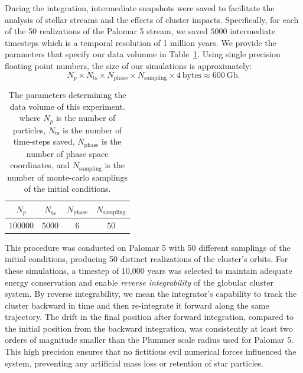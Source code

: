 \documentclass{aa}
\begin{document}
    During the integration, intermediate snapshots were saved to facilitate the analysis of stellar streams and the effects of cluster impacts. Specifically, for each of the 50 realizations of the Palomar 5 stream, we saved $5000$ intermediate timesteps which is a temporal resolution of 1 million years. We provide the parameters that specify our data volumne in Table~\ref{tab:data_volume}. Using single precision floating point numbers, the size of our simulations is approximately:
    \begin{equation} \label{eq:data_volume_estimate}
      N_p \times N_{\textrm{ts}}\times N_{\textrm{phase}}\times N_{\textrm{sampling}} \times 4~\textrm{bytes}\approx 600~\textrm{Gb}.
    \end{equation}

    \begin{table}[h]
      \centering
      \begin{tabular}{|c|c|c|c|}
          \hline
          $N_p$ & $N_{\textrm{ts}}$ & $N_{\textrm{phase}}$ & $N_{\textrm{sampling}}$ \\
          \hline
          $100000$ & $5000$ & $6$ & $50$ \\
          \hline
      \end{tabular}
      \caption{The parameters determining the data volume of this experiment. where $N_p$  is the number of particles, $N_{\textrm{ts}}$ is the number of time-steps saved, $N_{\textrm{phase}}$ is the number of phase space coordinates, and $N_{\textrm{sampling}}$ is the number of monte-carlo samplings of the initial conditions.}
      \label{tab:data_volume}
  \end{table}


  This procedure was conducted on Palomar 5 with 50 different samplings of the initial conditions, producing 50 distinct realizations of the cluster's orbits. For these simulations, a timestep of 10,000 years was selected to maintain adequate energy conservation and enable \textit{reverse integrability} of the globular cluster system. By reverse integrability, we mean the integrator's capability to track the cluster backward in time and then re-integrate it forward along the same trajectory. The drift in the final position after forward integration, compared to the initial position from the backward integration, was consistently at least two orders of magnitude smaller than the Plummer scale radius used for Palomar 5. This high precision ensures that no fictitious evil numerical forces influenced the system, preventing any artificial mass loss or retention of star particles.
\end{document}

